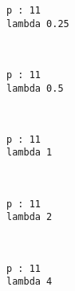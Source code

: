 \documentclass[11pt]{article}
\begin{document}
    \begin{Verbatim}[commandchars=\\\{\}]
p : 11
lambda 0.25

    \end{Verbatim}

    \begin{center}
    \end{center}
    { \hspace*{\fill} \\}
    
    \begin{Verbatim}[commandchars=\\\{\}]
p : 11
lambda 0.5

    \end{Verbatim}

    \begin{center}
    \end{center}
    { \hspace*{\fill} \\}
    
    \begin{Verbatim}[commandchars=\\\{\}]
p : 11
lambda 1

    \end{Verbatim}

    \begin{center}
    \end{center}
    { \hspace*{\fill} \\}
    
    \begin{Verbatim}[commandchars=\\\{\}]
p : 11
lambda 2

    \end{Verbatim}

    \begin{center}
    \end{center}
    { \hspace*{\fill} \\}
    
    \begin{Verbatim}[commandchars=\\\{\}]
p : 11
lambda 4

    \end{Verbatim}
\end{document}
